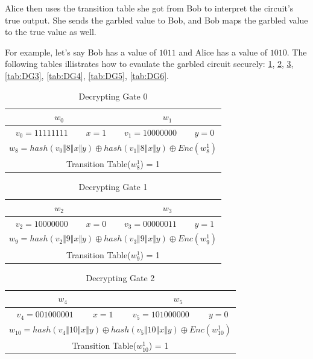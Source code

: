\documentclass[times]{article}
\begin{document}
	Alice then uses the transition table she got from Bob to interpret the circuit's true output. She sends the garbled value to Bob, and Bob maps the garbled value to the true value as well.

	For example, let's say Bob has a value of $1011$ and Alice has a value of $1010$. The following tables illistrates how to evaulate the garbled circuit securely: \ref{tab:DG0}, \ref{tab:DG1}, \ref{tab:DG2}, \ref{tab:DG3}, \ref{tab:DG4}, \ref{tab:DG5}, \ref{tab:DG6}.


	\begin{table}
		\centering
		\caption{Decrypting Gate 0}
		\label{tab:DG0}
		\begin{tabular}{|c|c||c|c|}
			\hline
			\multicolumn{2}{|c||}{$w_0$} & \multicolumn{2}{|c|}{$w_1$} \\
			\hline
			$v_0 = 11111111$ & $x = 1$ & $v_1 = 10000000$ & $y = 0$ \\
			\hline
			\multicolumn{4}{|c||}{$w_8 = hash(v_0 \Vert 8 \Vert x \Vert y) \oplus hash(v_1 \Vert 8 \Vert x \Vert y) \oplus Enc(w_8^1)$} \\
			\hline
			\multicolumn{4}{|c||}{Transition Table($w_8^1$) = 1} \\
			\hline
		\end{tabular}
	\end{table}

	\begin{table}
		\centering
		\caption{Decrypting Gate 1}
		\label{tab:DG1}
		\begin{tabular}{|c|c||c|c|}
			\hline
			\multicolumn{2}{|c||}{$w_2$} & \multicolumn{2}{|c|}{$w_3$} \\
			\hline
			$v_2 = 10000000$ & $x = 0$ & $v_3 = 00000011$ & $y = 1$ \\
			\hline
			\multicolumn{4}{|c||}{$w_9 = hash(v_2 \Vert 9 \Vert x \Vert y) \oplus hash(v_3 \Vert 9 \Vert x \Vert y) \oplus Enc(w_9^1)$} \\
			\hline
			\multicolumn{4}{|c||}{Transition Table($w_9^1$) = 1} \\
			\hline
		\end{tabular}
	\end{table}

	\begin{table}
		\centering
		\caption{Decrypting Gate 2}
		\label{tab:DG2}
		\begin{tabular}{|c|c||c|c|}
			\hline
			\multicolumn{2}{|c||}{$w_4$} & \multicolumn{2}{|c|}{$w_5$} \\
			\hline
			$v_4 = 001000001$ & $x = 1$ & $v_5 = 101000000$ & $y = 0$ \\
			\hline
			\multicolumn{4}{|c||}{$w_{10} = hash(v_4 \Vert 10 \Vert x \Vert y) \oplus hash(v_5 \Vert 10 \Vert x \Vert y) \oplus Enc(w_{10}^1)$} \\
			\hline
			\multicolumn{4}{|c||}{Transition Table($w_{10}^1$) = 1} \\
			\hline
		\end{tabular}
	\end{table}
\end{document}
